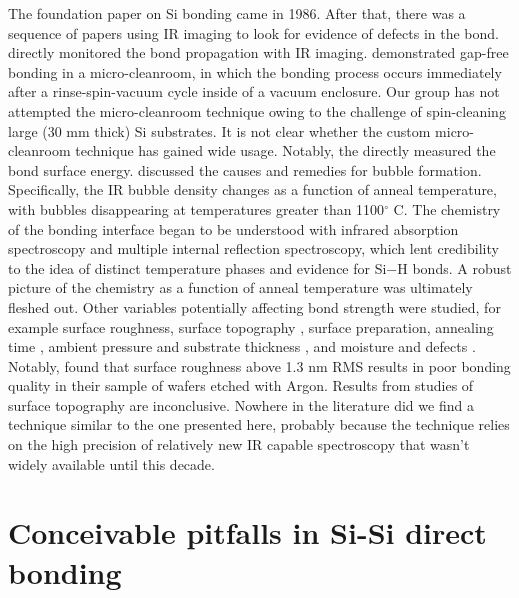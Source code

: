 \documentclass[osajnl,preprint,showpacs,superscriptaddress,12pt]{revtex4-1} %
\begin{document}
The foundation paper on Si bonding came in 1986\cite{1986JAP....60.2987S}.  After that, there was a sequence of papers using IR imaging to look for evidence of defects in the bond.  \cite{1988JaJAP..27L2364S, 1995ApPhL..67.3614G} directly monitored the bond propagation with IR imaging.  \cite{1988JaJAP..27L2364S, 1989JaJAP..28L2141L} demonstrated gap-free bonding in a micro-cleanroom, in which the bonding process occurs immediately after a rinse-spin-vacuum cycle inside of a vacuum enclosure.  Our group has not attempted the micro-cleanroom technique owing to the challenge of spin-cleaning large (30 mm thick) Si substrates.  It is not clear whether the custom micro-cleanroom technique has gained wide usage.  Notably, the   \cite{1989JaJAP..28L2141L} directly measured the bond surface energy.  \cite{Mitani1990} discussed the causes and remedies for bubble formation.  Specifically, the IR bubble density changes as a function of anneal temperature\cite{1992JEMat..21..669M}, with bubbles disappearing at temperatures greater than 1100$^\circ$ C.  The chemistry of the bonding interface began to be understood with infrared absorption spectroscopy and multiple internal reflection spectroscopy\cite{feijoo1994}, which lent credibility to the idea of distinct temperature phases and evidence for Si$-$H bonds\cite{1995ApPhA..61..101R}.  A robust picture of the chemistry as a function of anneal temperature was ultimately fleshed out\cite{1996JaJAP..35.2102R, 1998AnRMS..28..215G}.  Other variables potentially affecting bond strength were studied, for example surface roughness\cite{JJAP.37.4197}, surface topography \cite{2001JOptA...3...85G}, surface preparation\cite{1996ApPhL..68.2222T}, annealing time \cite{2000JAP....88.4404H}, ambient pressure and substrate thickness \cite{1995ApPhL..67..863G, 2007ApOpt..46.6793H}, and moisture and defects \cite{2001JAP....89.6013L}.  Notably, \cite{JJAP.37.4197} found that surface roughness above 1.3 nm RMS results in poor bonding quality in their sample of wafers etched with Argon.  Results from studies of surface topography are inconclusive\cite{2001JOptA...3...85G}.  Nowhere in the literature did we find a technique similar to the one presented here, probably because the technique relies on the high precision of relatively new IR capable spectroscopy that wasn't widely available until this decade.


\section{Conceivable pitfalls in Si-Si direct bonding}
\end{document}
